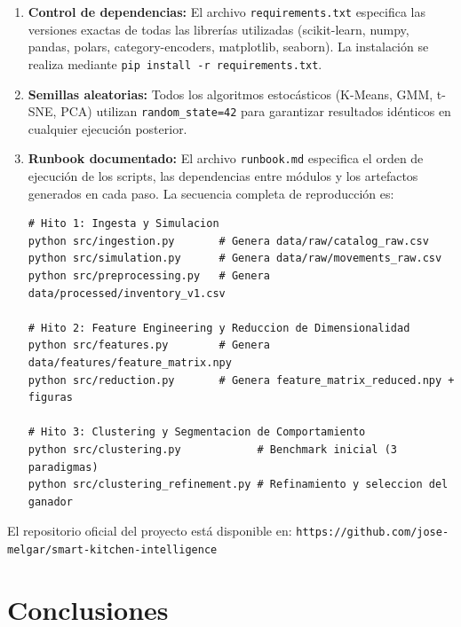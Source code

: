 \documentclass[12pt,a4paper]{article}
\newcommand{\code}[1]{\texttt{\small #1}}
\begin{document}
\begin{enumerate}
    \item \textbf{Control de dependencias:} El archivo \code{requirements.txt} especifica las versiones exactas de todas las librerías utilizadas (scikit-learn, numpy, pandas, polars, category-encoders, matplotlib, seaborn). La instalación se realiza mediante \code{pip install -r requirements.txt}.

    \item \textbf{Semillas aleatorias:} Todos los algoritmos estocásticos (K-Means, GMM, t-SNE, PCA) utilizan \code{random\_state=42} para garantizar resultados idénticos en cualquier ejecución posterior.

    \item \textbf{Runbook documentado:} El archivo \code{runbook.md} especifica el orden de ejecución de los scripts, las dependencias entre módulos y los artefactos generados en cada paso. La secuencia completa de reproducción es:

\begin{lstlisting}[style=pythonstyle, caption={Secuencia de ejecuci\'on del pipeline completo de SKI}, label={lst:pipeline}]
# Hito 1: Ingesta y Simulacion
python src/ingestion.py       # Genera data/raw/catalog_raw.csv
python src/simulation.py      # Genera data/raw/movements_raw.csv
python src/preprocessing.py   # Genera data/processed/inventory_v1.csv

# Hito 2: Feature Engineering y Reduccion de Dimensionalidad
python src/features.py        # Genera data/features/feature_matrix.npy
python src/reduction.py       # Genera feature_matrix_reduced.npy + figuras

# Hito 3: Clustering y Segmentacion de Comportamiento
python src/clustering.py            # Benchmark inicial (3 paradigmas)
python src/clustering_refinement.py # Refinamiento y seleccion del ganador
\end{lstlisting}
\end{enumerate}

El repositorio oficial del proyecto está disponible en: \texttt{https://github.com/jose-melgar/smart-kitchen-intelligence}

\section{Conclusiones}
\end{document}
